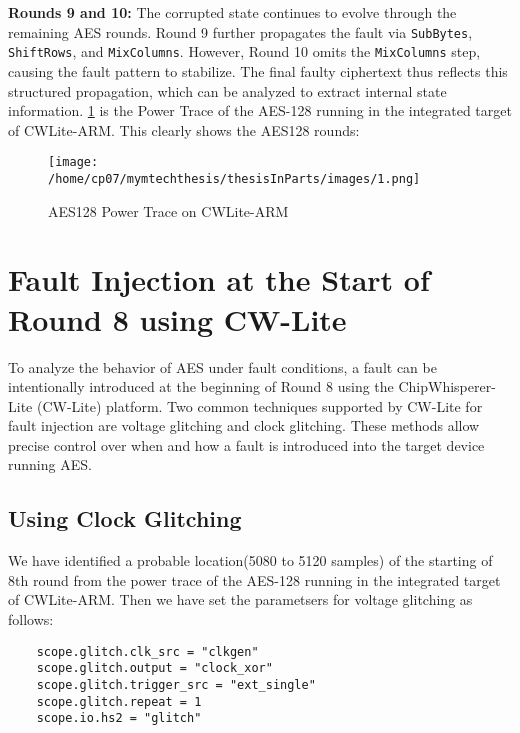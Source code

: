 \textbf{Rounds 9 and 10:}
The corrupted state continues to evolve through the remaining AES rounds. Round 9 further propagates the fault via \texttt{SubBytes}, \texttt{ShiftRows}, and \texttt{MixColumns}. However, Round 10 omits the \texttt{MixColumns} step, causing the fault pattern to stabilize. The final faulty ciphertext thus reflects this structured propagation, which can be analyzed to extract internal state information.
\ref{fig:powertrace} is the Power Trace of the AES-128 running in the integrated target of CWLite-ARM. This clearly shows the AES128 rounds:
\begin{figure}[h]
    \centering
    \texttt{[image: /home/cp07/mymtechthesis/thesisInParts/images/1.png]}
    \caption{AES128 Power Trace on CWLite-ARM}
    \label{fig:powertrace}
\end{figure}
\section{Fault Injection at the Start of Round 8 using CW-Lite}

To analyze the behavior of AES under fault conditions, a fault can be intentionally introduced at the beginning of Round 8 using the ChipWhisperer-Lite (CW-Lite) platform. Two common techniques supported by CW-Lite for fault injection are voltage glitching and clock glitching. These methods allow precise control over when and how a fault is introduced into the target device running AES.

\subsection{Using Clock Glitching}
We have identified a probable location(5080 to 5120 samples) of the starting of 8th round from the power trace of the AES-128 running in the integrated target of CWLite-ARM. Then we have set the parametsers for voltage glitching as follows:
\begin{verbatim}
    scope.glitch.clk_src = "clkgen"
    scope.glitch.output = "clock_xor"
    scope.glitch.trigger_src = "ext_single"
    scope.glitch.repeat = 1
    scope.io.hs2 = "glitch"
\end{verbatim}
